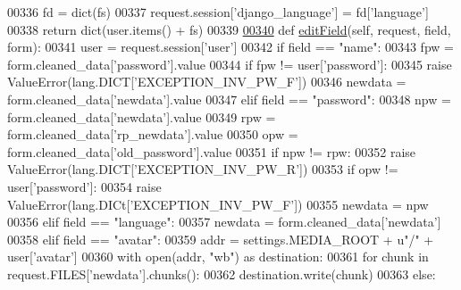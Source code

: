 \begin{DoxyCode}
00336         fd = dict(fs)
00337         request.session[\textcolor{stringliteral}{'django\_language'}] = fd[\textcolor{stringliteral}{'language'}]
00338         \textcolor{keywordflow}{return} dict(user.items() + fs)
00339 
\hypertarget{ProfileUnit_8py_source_l00340}{}\hyperlink{classProfile_1_1ProfileUnit_1_1BusProfile_a61886054c405cb4d8ccca925dcfbf399}{00340}     \textcolor{keyword}{def }\hyperlink{classProfile_1_1ProfileUnit_1_1BusProfile_a61886054c405cb4d8ccca925dcfbf399}{editField}(self, request, field, form):
00341         user = request.session[\textcolor{stringliteral}{'user'}]
00342         \textcolor{keywordflow}{if} field == \textcolor{stringliteral}{"name"}:
00343             fpw = form.cleaned\_data[\textcolor{stringliteral}{'password'}].value
00344             \textcolor{keywordflow}{if} fpw != user[\textcolor{stringliteral}{'password'}]:
00345                 \textcolor{keywordflow}{raise} ValueError(lang.DICT[\textcolor{stringliteral}{'EXCEPTION\_INV\_PW\_F'}])
00346             newdata = form.cleaned\_data[\textcolor{stringliteral}{'newdata'}].value
00347         \textcolor{keywordflow}{elif} field == \textcolor{stringliteral}{"password"}:
00348             npw = form.cleaned\_data[\textcolor{stringliteral}{'newdata'}].value
00349             rpw = form.cleaned\_data[\textcolor{stringliteral}{'rp\_newdata'}].value
00350             opw = form.cleaned\_data[\textcolor{stringliteral}{'old\_password'}].value
00351             \textcolor{keywordflow}{if} npw != rpw:
00352                 \textcolor{keywordflow}{raise} ValueError(lang.DICT[\textcolor{stringliteral}{'EXCEPTION\_INV\_PW\_R'}])
00353             \textcolor{keywordflow}{if} opw != user[\textcolor{stringliteral}{'password'}]:
00354                 \textcolor{keywordflow}{raise} ValueError(lang.DICt[\textcolor{stringliteral}{'EXCEPTION\_INV\_PW\_F'}])
00355             newdata = npw
00356         \textcolor{keywordflow}{elif} field == \textcolor{stringliteral}{"language"}:
00357             newdata = form.cleaned\_data[\textcolor{stringliteral}{'newdata'}]
00358         \textcolor{keywordflow}{elif} field == \textcolor{stringliteral}{"avatar"}:
00359             addr = settings.MEDIA\_ROOT + \textcolor{stringliteral}{u"/"} + user[\textcolor{stringliteral}{'avatar'}]
00360             with open(addr, \textcolor{stringliteral}{"wb"}) \textcolor{keyword}{as} destination:
00361                     \textcolor{keywordflow}{for} chunk \textcolor{keywordflow}{in} request.FILES[\textcolor{stringliteral}{'newdata'}].chunks():
00362                         destination.write(chunk)
00363         \textcolor{keywordflow}{else}:

\end{DoxyCode}

